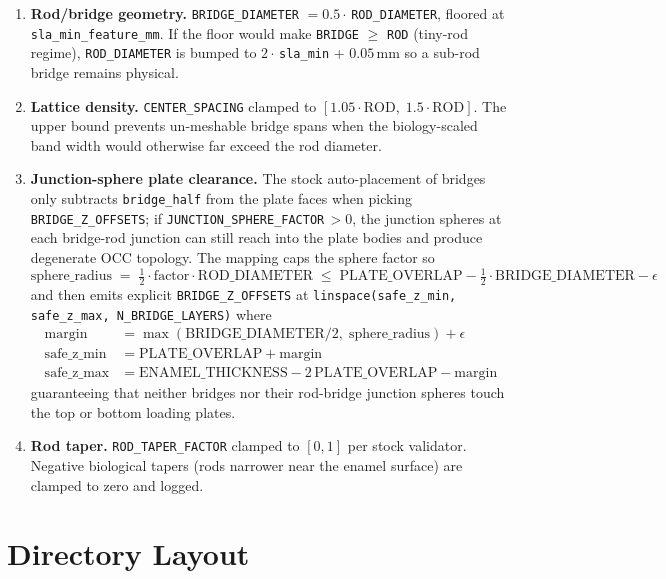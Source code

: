 \documentclass[11pt, letterpaper]{article}
\begin{document}
\begin{mechanismbox}
\begin{enumerate}
  \item \textbf{Rod/bridge geometry.} \texttt{BRIDGE\_DIAMETER} $=0.5\cdot$\,\texttt{ROD\_DIAMETER}, floored at \texttt{sla\_min\_feature\_mm}. If the floor would make \texttt{BRIDGE} $\geq$ \texttt{ROD} (tiny-rod regime), \texttt{ROD\_DIAMETER} is bumped to $2\cdot$\,\texttt{sla\_min} + $0.05$\,mm so a sub-rod bridge remains physical.
  \item \textbf{Lattice density.} \texttt{CENTER\_SPACING} clamped to $[1.05\cdot\text{ROD},\; 1.5\cdot\text{ROD}]$. The upper bound prevents un-meshable bridge spans when the biology-scaled band width would otherwise far exceed the rod diameter.
  \item \textbf{Junction-sphere plate clearance.} The stock auto-placement of bridges only subtracts \texttt{bridge\_half} from the plate faces when picking \texttt{BRIDGE\_Z\_OFFSETS}; if \texttt{JUNCTION\_SPHERE\_FACTOR}\,$>0$, the junction spheres at each bridge-rod junction can still reach into the plate bodies and produce degenerate OCC topology. The mapping caps the sphere factor so
  \[
    \text{sphere\_radius} \;=\; \tfrac{1}{2}\cdot\text{factor}\cdot\text{ROD\_DIAMETER} \;\leq\; \text{PLATE\_OVERLAP} - \tfrac{1}{2}\cdot\text{BRIDGE\_DIAMETER} - \epsilon
  \]
  and then emits explicit \texttt{BRIDGE\_Z\_OFFSETS} at \texttt{linspace(safe\_z\_min, safe\_z\_max, N\_BRIDGE\_LAYERS)} where
  \[
    \begin{aligned}
      \text{margin}     &= \max(\text{BRIDGE\_DIAMETER}/2,\; \text{sphere\_radius}) + \epsilon \\
      \text{safe\_z\_min} &= \text{PLATE\_OVERLAP} + \text{margin} \\
      \text{safe\_z\_max} &= \text{ENAMEL\_THICKNESS} - 2\,\text{PLATE\_OVERLAP} - \text{margin}
    \end{aligned}
  \]
  guaranteeing that neither bridges nor their rod-bridge junction spheres touch the top or bottom loading plates.
  \item \textbf{Rod taper.} \texttt{ROD\_TAPER\_FACTOR} clamped to $[0, 1]$ per stock validator. Negative biological tapers (rods narrower near the enamel surface) are clamped to zero and logged.
\end{enumerate}
\end{mechanismbox}

\section{Directory Layout}
\end{document}
